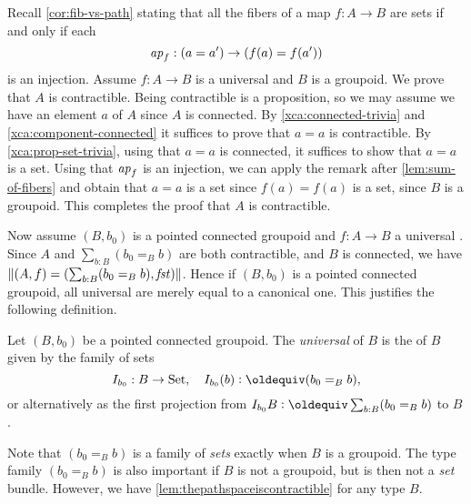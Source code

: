 Recall \cref{cor:fib-vs-path} stating that all the fibers of a map $f:A\to B$ 
are sets if and only if each 
\[
\mathop{{\it ap}_{f}}: (a=a')\to (f(a)=f(a'))
\]
is an injection. 
Assume $f:A\to B$ is a universal \covering and $B$ is a groupoid.
We prove that $A$ is contractible. 
Being contractible is a proposition, so we may assume 
we have an element $a$ of $A$ since $A$ is connected. 
By \cref{xca:connected-trivia} and \ref{xca:component-connected} 
it suffices to prove that $a=a$ is contractible.
By \cref{xca:prop-set-trivia}, using that $a=a$ is connected,
it suffices to show that $a=a$ is a set.
Using that $\mathop{{\it ap}_{f}}$ is an injection, we can apply the remark after
\cref{lem:sum-of-fibers} and obtain that $a=a$ is a set since
$f(a)=f(a)$ is a set, since $B$ is a groupoid.
This completes the proof that $A$ is contractible.

Now assume $(B,b_0)$ is a pointed connected groupoid and $f:A\to B$
a universal \covering. Since $A$ and $\sum_{b:B}(b_0=_Bb)$ are both
contractible, and $B$ is connected, we have
$\lVert(A,f)=(\sum_{b:B}(b_0=_Bb),\mathop{\mathit{fst}})\rVert$. 
Hence if $(B,b_0)$ is a pointed connected groupoid, all
universal \coverings are merely equal to a canonical one. 
This justifies the following definition.
\begin{definition}
  \label{def:universalcover}
  Let $(B,b_0)$ be a pointed connected groupoid.  
The \emph{universal \covering} of $B$ is the \covering of $B$ given by the family of sets 
  $$\uc{b_0}:B\to\Set,\quad \uc{b_0}(b)\defequi (b_0=_Bb),$$
or alternatively as the first projection from $\uc{b_0}B\defequi\sum_{b:B}(b_0=_Bb)$ to $B$. 
\end{definition}
Note that $(b_0=_B b)$ is a family of \emph{sets} exactly when $B$ is a groupoid.
The type family $(b_0=_B b)$ is also important if $B$ is not a groupoid,
but is then not a \emph{set} bundle.
However, we have \cref{lem:thepathspaceiscontractible} for any type $B$.

